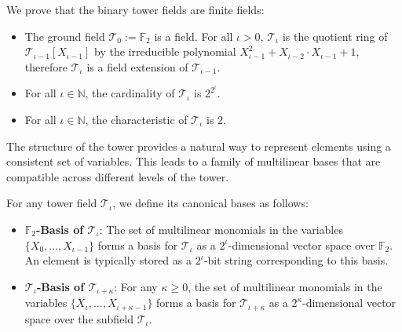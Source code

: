 \begin{theorem} 
  We prove that the binary tower fields are finite fields:
  \label{thm:binary_tower_fields_are_fields}
    \begin{itemize}
      \item The ground field $\mathcal{T}_{0} := \mathbb{F}_2$ is a field. For all $\iota > 0$, $\mathcal{T}_{\iota}$ is the quotient ring of $\mathcal{T}_{\iota-1}[X_{\iota-1}]$ by the irreducible polynomial $X_{\iota-1}^{2}+X_{\iota-2} \cdot X_{\iota-1}+1$, therefore $\mathcal{T}_{\iota}$ is a field extension of $\mathcal{T}_{\iota-1}$.
      \item For all $\iota \in \mathbb{N}$, the cardinality of $\mathcal{T}_{\iota}$ is $2^{2^{\iota}}$.
      \item For all $\iota \in \mathbb{N}$, the characteristic of $\mathcal{T}_{\iota}$ is 2.
    \end{itemize}
\end{theorem}

The structure of the tower provides a natural way to represent elements using a consistent set of variables. This leads to a family of multilinear bases that are compatible across different levels of the tower.

\begin{definition}
    \label{def:multilinear_basis}
    For any tower field $\mathcal{T}_\iota$, we define its canonical bases as follows:
    \begin{itemize}
        \item \textbf{$\mathbb{F}_2$-Basis of $\mathcal{T}_\iota$}: The set of multilinear monomials in the variables $\{X_0, \dots, X_{\iota-1}\}$ forms a basis for $\mathcal{T}_\iota$ as a $2^\iota$-dimensional vector space over $\mathbb{F}_2$. An element is typically stored as a $2^\iota$-bit string corresponding to this basis.
        \item \textbf{$\mathcal{T}_\iota$-Basis of $\mathcal{T}_{\iota+\kappa}$}: For any $\kappa \ge 0$, the set of multilinear monomials in the variables $\{X_\iota, \dots, X_{\iota+\kappa-1}\}$ forms a basis for $\mathcal{T}_{\iota+\kappa}$ as a $2^\kappa$-dimensional vector space over the subfield $\mathcal{T}_\iota$.
    \end{itemize}
\end{definition}


